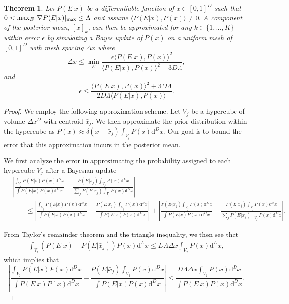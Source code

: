 \documentclass[aps,amsmath,onecolumn,amssymb]{revtex4}
\newtheorem{theorem}{Theorem}
\begin{document}
\begin{theorem}
Let $P(E|x)$ be a differentiable function of $x\in [0,1]^D$ such that $0< \max_E|\nabla P(E|x) |_{\rm max} \le \Lambda$ and assume $\langle P(E|x), P(x)\rangle \ne 0$.   A component of the posterior mean, $[x]_k$, can then  be approximated for any $k\in \{1,\ldots, K\}$ within error $\epsilon$ by simulating a Bayes update of $P(x)$ on a uniform mesh of $[0,1]^D$ with mesh spacing $\Delta x$ where 
$$\Delta x \le \min_E \frac{\epsilon \langle P(E|x),P(x)\rangle^2}{\langle P(E|x),P(x)\rangle^2+3{D} \Lambda},$$
and
$$\epsilon \le \frac{\langle P(E|x),P(x)\rangle^2+ 3D\Lambda}{2 D\Lambda\langle P(E|x),P(x)\rangle}.$$
\label{thm:errbd}
\end{theorem}
\begin{proof}
We employ the following approximation scheme.  Let $V_j$ be a hypercube of volume $\Delta x^D$ with centroid $\bar{x}_j$.  We then approximate the prior distribution within the hypercube as $P(x) \approx  \delta (x-\bar{x}_j)\int_{V_j} P(x) \mathrm{d}^D x$.  Our goal is to bound the error that this approximation incurs in the posterior mean.

We first analyze the error in approximating the probability assigned to each hypercube $V_j$ after a Bayesian update
\begin{align}
&\left|\frac{\int_{V_j}P(E|x) P(x) \mathrm{d}^D x}{\int P(E|x) P(x) \mathrm{d}^D x} - \frac{P(E|\bar{x}_j)\int_{V_j} P(x) \mathrm{d}^D x}{\sum_jP(E|\bar{x}_j)\int_{V_j} P(x) \mathrm{d}^D x} \right|\nonumber\\
&\qquad\le \left|\frac{\int_{V_j}P(E|x) P(x) \mathrm{d}^D x}{\int P(E|x) P(x) \mathrm{d}^D x} - \frac{P(E|\bar{x}_j)\int_{V_j} P(x) \mathrm{d}^D x}{\int P(E|x) P(x) \mathrm{d}^D x} \right|+\left|\frac{P(E|\bar{x}_j)\int_{V_j} P(x) \mathrm{d}^D x}{\int P(E|x) P(x) \mathrm{d}^D x} - \frac{P(E|\bar{x}_j)\int_{V_j} P(x) \mathrm{d}^D x}{\sum_jP(E|\bar{x}_j)\int_{V_j} P(x) \mathrm{d}^D x} \right|.\label{eq:triangleeq}
\end{align}

From Taylor's remainder theorem and the triangle inequality, we then see that
\begin{align}
\int_{V_j} (P(E|x)-P(E|\bar{x}_j))P(x) \mathrm{d}^Dx\le D\Lambda \Delta x \int_{V_j} P(x)\mathrm{d}^Dx,
\end{align}
which implies that
\begin{equation}
 \left|\frac{\int_{V_j}P(E|x) P(x) \mathrm{d}^D x}{\int P(E|x) P(x) \mathrm{d}^D x} - \frac{P(E|\bar{x}_j)\int_{V_j} P(x) \mathrm{d}^D x}{\int P(E|x) P(x) \mathrm{d}^D x} \right| \le \frac{D\Lambda \Delta x\int_{V_j} P(x)\mathrm{d}^Dx}{\int P(E|x) P(x) \mathrm{d}^D x}.\label{eq:term1}
\end{equation}


\end{proof}
\end{document}

